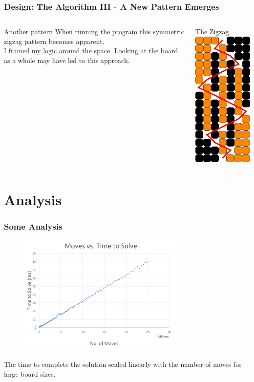 \documentclass{beamer}
\begin{document}
	\begin{frame}
		\frametitle{Design: The Algorithm III - A New Pattern Emerges}	
		\begin{columns}[T]
			\begin{column}{.5\textwidth}
				\begin{block}{Another pattern}
				When running the program 
				this symmetric zigzag pattern becomes apparent.
				\\\bigskip
				I framed my logic around the space. Looking at the board as a whole 
				may have led to this approach. 
				\end{block}
			\end{column}
			
			\begin{column}{.5\textwidth}
				\begin{block}{The Zigzag}
				\includegraphics[width=3cm]{pegboardsolved}
				
				\end{block}
			\end{column}
		\end{columns}
	\end{frame}

\section{Analysis}
	\begin{frame}
		\frametitle{Some Analysis}
					

			\begin{figure}
				\includegraphics[height=6cm]{pegboardtime}
			\end{figure}
			The time to complete the solution scaled linearly with the number of moves for large board sizes.	
			
	\end{frame}
\end{document}
